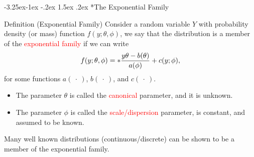 \documentclass[final]{article}\usepackage[]{graphicx}\usepackage[svgnames]{xcolor}
\makeatletter
\renewcommand\subsection{\@startsection{subsection}{2}{\z@}%
                                     {-3.25ex\@plus -1ex \@minus -.2ex}%
                                     {1.5ex \@plus .2ex}%
                                     {\normalfont\large\bfseries\scshape\color{Blue}}}
\let\exp\relax%
\makeatother
\begin{document}
\subsection*{The Exponential Family}
\begin{Regular}{Definition (Exponential Family)}
    Consider a random variable $ Y $ with probability density (or mass) function $ f(y;\theta,\phi) $,
    we say that the distribution is a member of the \textcolor{Red}{exponential family} if we can write
    \[ f(y;\theta,\phi)=\exp*{\frac{y\theta-b(\theta)}{a(\phi)}+c(y;\phi)}, \]
    for some functions $ a(\:\cdot\:) $, $ b(\:\cdot\:) $, and $ c(\:\cdot\:) $.
    \begin{itemize}
        \item The parameter $ \theta $ is called the \textcolor{Red}{canonical} parameter, and it is unknown.
        \item The parameter $ \phi $ is called the \textcolor{Red}{scale/dispersion} parameter, is constant, and assumed to be known.
    \end{itemize}
\end{Regular}
Many well known distributions (continuous/discrete) can be shown to be a
member of the exponential family.
\end{document}
